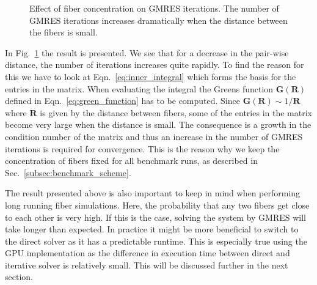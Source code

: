 \begin{figure}[!htbp]
  \centering
  \caption[Effect of fiber concentration on GMRES iterations.]{Effect of fiber concentration on GMRES iterations. The number of GMRES iterations increases dramatically when the distance between the fibers is small.}
  \label{fig:concentration_gmres}
\end{figure}

In Fig.~\ref{fig:concentration_gmres} the result is presented. We see that for a decrease in the pair-wise distance, the number of iterations increases quite rapidly. To find the reason for this we have to look at Eqn.~\eqref{eq:inner_integral} which forms the basis for the entries in the matrix. When evaluating the integral the Greens function $\mathbf{G}(\mathbf{R})$ defined in Eqn.~\eqref{eq:green_function} has to be computed. Since $\mathbf{G}(\mathbf{R}) \sim 1/\mathbf{R}$ where $\mathbf{R}$ is given by the distance between fibers, some of the entries in the matrix become very large when the distance is small. The consequence is a growth in the condition number of the matrix and thus an increase in the number of GMRES iterations is required for convergence. This is the reason why we keep the concentration of fibers fixed for all benchmark runs, as described in Sec.~\ref{subsec:benchmark_scheme}.

The result presented above is also important to keep in mind when performing long running fiber simulations. Here, the probability that any two fibers get close to each other is very high. If this is the case, solving the system by GMRES will take longer than expected. In practice it might be more beneficial to switch to the direct solver as it has a predictable runtime. This is especially true using the GPU implementation as the difference in execution time between direct and iterative solver is relatively small. This will be discussed further in the next section.

